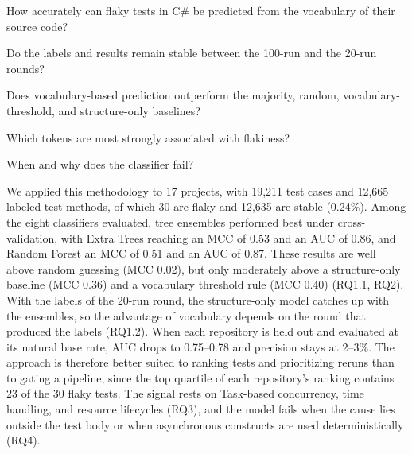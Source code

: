 \begin{description}[leftmargin=1.2em,labelindent=0pt,itemsep=1pt]
  \item[RQ1.1] How accurately can flaky tests in C\# be predicted from the vocabulary of their source code?
  \item[RQ1.2] Do the labels and results remain stable between the 100-run and the 20-run rounds?
  \item[RQ2] Does vocabulary-based prediction outperform the majority, random, vocabulary-threshold, and structure-only baselines?
  \item[RQ3] Which tokens are most strongly associated with flakiness?
  \item[RQ4] When and why does the classifier fail?
\end{description}

We applied this methodology to 17 projects, with 19,211 test cases and 12,665 labeled test methods, of which 30 are flaky and 12,635 are stable (0.24\%). Among the eight classifiers evaluated, tree ensembles performed best under cross-validation, with Extra Trees reaching an MCC of 0.53 and an AUC of 0.86, and Random Forest an MCC of 0.51 and an AUC of 0.87. These results are well above random guessing (MCC 0.02), but only moderately above a structure-only baseline (MCC 0.36) and a vocabulary threshold rule (MCC 0.40) (RQ1.1, RQ2). With the labels of the 20-run round, the structure-only model catches up with the ensembles, so the advantage of vocabulary depends on the round that produced the labels (RQ1.2). When each repository is held out and evaluated at its natural base rate, AUC drops to 0.75--0.78 and precision stays at 2--3\%. The approach is therefore better suited to ranking tests and prioritizing reruns than to gating a pipeline, since the top quartile of each repository's ranking contains 23 of the 30 flaky tests. The signal rests on Task-based concurrency, time handling, and resource lifecycles (RQ3), and the model fails when the cause lies outside the test body or when asynchronous constructs are used deterministically (RQ4).

